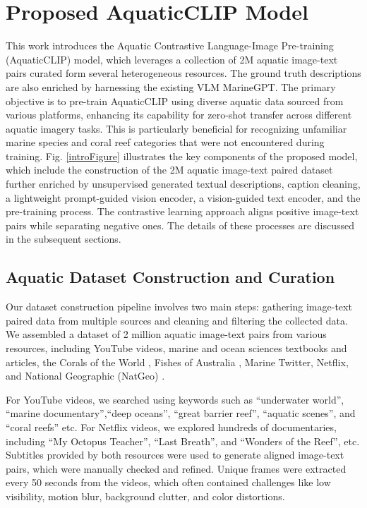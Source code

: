 \section{Proposed AquaticCLIP Model}
\label{sec:method}
This work introduces the Aquatic Contrastive Language-Image Pre-training (AquaticCLIP) model, which leverages a collection of 2M aquatic image-text pairs curated form several heterogeneous resources. 
The ground truth descriptions are also enriched by harnessing the existing VLM MarineGPT.
The primary objective is to pre-train AquaticCLIP using diverse aquatic data sourced from various platforms, enhancing its capability for zero-shot transfer across different aquatic imagery tasks.
This is particularly beneficial for recognizing unfamiliar marine species and coral reef categories that were not encountered during training.
Fig. \ref{introFigure} illustrates the key components of the proposed model, which include the construction of the 2M aquatic image-text paired dataset further enriched by unsupervised generated textual descriptions, caption cleaning, a lightweight prompt-guided vision encoder, a vision-guided text encoder, and the pre-training process. 
The contrastive learning approach aligns positive image-text pairs while separating negative ones. 
The details of these processes are discussed in the subsequent sections.

\subsection{Aquatic Dataset Construction and Curation}
\label{sec:dataset}
Our dataset construction pipeline involves two main steps: gathering image-text paired data from multiple sources and cleaning and filtering the collected data.
We assembled a dataset of 2 million aquatic image-text pairs from various resources, including YouTube videos, marine and ocean sciences textbooks and articles, the Corals of the World \cite{veron2016corals}, Fishes of Australia \cite{van2014family, schodde1997zoological, merrick2006australasian,shelley2017revision}, Marine Twitter, Netflix, and National Geographic (NatGeo) \cite{doe2023coral, national_geographic_coral, ng_coral_bleaching, ng_ocean_acidification,ng_great_barrier_reef,ng_coral_conservation,ng_ocean_biodiversity}.

For YouTube videos, we searched using keywords such as ``underwater world'', ``marine documentary'',``deep oceans'', ``great barrier reef'', ``aquatic scenes'', and ``coral reefs'' etc. 
For Netflix videos, we explored hundreds of documentaries, including ``My Octopus Teacher'', ``Last Breath'', and ``Wonders of the Reef'', etc.
Subtitles provided by both resources were used to generate aligned image-text pairs, which were manually checked and refined. 
Unique frames were extracted every 50 seconds from the videos, which often contained challenges like low visibility, motion blur, background clutter, and color distortions.

